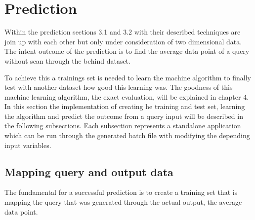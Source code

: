 \documentclass{lmproj}
\begin{document}
\clearpage
\section{Prediction}
Within the prediction sections 3.1 and 3.2 with their described techniques are join up with each other but only under consideration of two dimensional data. The intent outcome of the prediction is to find the average data point of a query without scan through the behind dataset. 

To achieve this a trainings set is needed to learn the machine algorithm to finally test with another dataset how good this learning was. The goodness of this machine learning algorithm, the exact evaluation, will be explained in chapter 4. In this section the implementation of creating he training and test set, learning the algorithm and predict the outcome from a query input will be described in the following subsections. Each subsection represents a standalone application which can be run through the generated batch file with modifying the depending input variables. 

\subsection{Mapping query and output data}

The fundamental for a successful prediction is to create a training set that is mapping the query that was generated through the actual output, the average data point.
\end{document}
